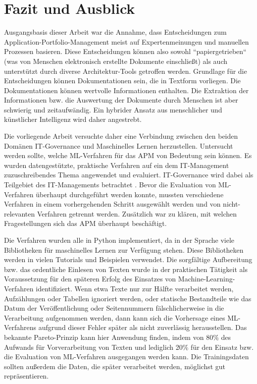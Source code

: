 \chapter{Fazit und Ausblick}
\label{chap5}

Ausgangsbasis dieser Arbeit war die Annahme, dass Entscheidungen zum Application-Portfolio-Management meist auf Expertenmeinungen und manuellen Prozessen basieren. Diese Entscheidungen können also sowohl ``papiergetrieben`` (was von Menschen elektronisch erstellte Dokumente einschließt) als auch unterstützt durch diverse Architektur-Tools getroffen werden. Grundlage für die Entscheidungen können Dokumentationen sein, die in Textform vorliegen. Die Dokumentationen können wertvolle Informationen enthalten. Die Extraktion der Informationen bzw. die Auswertung der Dokumente durch Menschen ist aber schwierig und zeitaufwändig. Ein hybrider Ansatz aus menschlicher und künstlicher Intelligenz wird daher angestrebt.

Die vorliegende Arbeit versuchte daher eine Verbindung zwischen den beiden Domänen IT-Governance und Maschinelles Lernen herzustellen. Untersucht werden sollte, welche ML-Verfahren für das APM von Bedeutung sein können. Es wurden datengestützte, praktische Verfahren auf ein dem IT-Management zuzuschreibendes Thema angewendet und evaluiert. IT-Governance wird dabei als Teilgebiet des IT-Managements betrachtet \cite[S. 6]{reiss}. Bevor die Evaluation von ML-Verfahren überhaupt durchgeführt werden konnte, mussten verschiedene Verfahren in einem vorhergehenden Schritt ausgewählt werden und von nicht-relevanten Verfahren getrennt werden. Zusätzlich war zu klären, mit welchen Fragestellungen sich das APM überhaupt beschäftigt.

Die Verfahren wurden alle in Python implementiert, da in der Sprache viele Bibliotheken für maschinelles Lernen zur Verfügung stehen. Diese Bibliotheken werden in vielen Tutorials und Beispielen verwendet. Die sorgfältige Aufbereitung bzw. das ordentliche Einlesen von Texten wurde in der praktischen Tätigkeit als Voraussetzung für den späteren Erfolg des Einsatzes von Machine-Learning-Verfahren identifiziert. Wenn etwa Texte nur zur Hälfte verarbeitet werden, Aufzählungen oder Tabellen ignoriert werden, oder statische Bestandteile wie das Datum der Veröffentlichung oder Seitennummern fälschlicherweise in die Verarbeitung aufgenommen werden, dann kann sich die Vorhersage eines ML-Verfahrens aufgrund dieser Fehler später als nicht zuverlässig herausstellen. Das bekannte Pareto-Prinzip kann hier Anwendung finden, indem von 80\% des Aufwands für Vorverarbeitung von Texten und lediglich 20\% für den Einsatz bzw. die Evaluation von ML-Verfahren ausgegangen werden kann. Die Trainingsdaten sollten außerdem die Daten, die später verarbeitet werden, möglichst gut repräsentieren. 

